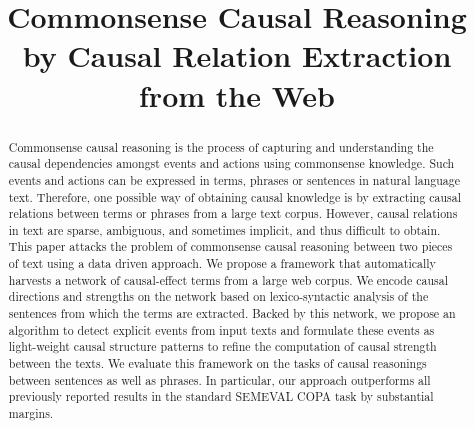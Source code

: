 \documentclass{sig-alternate}
\title{Commonsense Causal Reasoning by Causal Relation Extraction
from the Web
}
\begin{document}
\maketitle

\begin{abstract}
Commonsense causal reasoning is the process of capturing and understanding
the causal dependencies amongst events and actions using commonsense knowledge. 
Such events and actions can be expressed in terms, phrases or 
sentences in natural language text.
Therefore, one possible way of obtaining causal knowledge is by extracting
causal relations between terms or phrases from a large text corpus. 
However, causal relations in text are sparse, ambiguous, and sometimes implicit,
and thus difficult to obtain.
This paper attacks the problem of commonsense causal reasoning between two
pieces of text using a data driven approach.
We propose a framework that automatically harvests a network of
causal-effect terms from a large web corpus.
We encode causal directions and strengths on the
network based on lexico-syntactic analysis of the sentences from which
the terms are extracted.
Backed by this network, we propose an algorithm to detect explicit events 
from input texts and formulate these events as light-weight causal structure 
patterns to refine the computation of causal strength between the texts.
We evaluate this framework on the tasks of causal reasonings between sentences
as well as phrases. In particular, our approach outperforms all previously 
reported results in the standard SEMEVAL COPA task by substantial margins.
\end{abstract}















\end{document}
